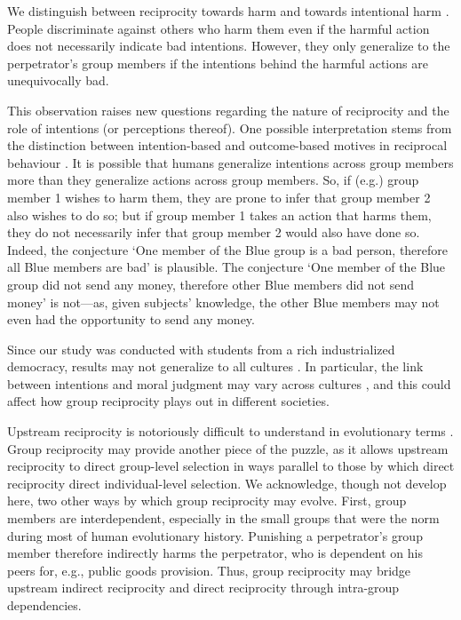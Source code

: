 \documentclass[12pt,a4paper]{article}\usepackage[]{graphicx}\usepackage[]{color}
\begin{document}
We distinguish between reciprocity towards harm and towards intentional harm
\citep{stanca2009testing}. People discriminate against others who harm them even
if the harmful action does not necessarily indicate bad intentions. However,
they only generalize to the perpetrator's  group members if the intentions
behind the harmful actions are unequivocally bad.

This observation raises new questions regarding the nature of reciprocity
and the role of intentions (or perceptions thereof). One possible
interpretation stems from the distinction between intention-based
and outcome-based motives in reciprocal behaviour \citep{falk2006theory}. It is
possible that humans generalize intentions across group members more than they generalize
actions across group members. So, if (e.g.)  group member 1 wishes to harm them,  they are prone to infer
that group member 2 also wishes to do so; but if group member 1 takes an action
that harms them, they do not necessarily infer that group member 2 would also
have done so. Indeed, the conjecture `One member of the Blue
group is a bad person, therefore all Blue members are bad' is plausible.
The conjecture `One member of the Blue group did not send any money,
therefore other Blue members did not send money' is not---as, given subjects' knowledge, the other Blue members may not even had the opportunity to send any money.

Since our study was conducted with students from a rich industrialized democracy, results may not generalize to all cultures \citep{henrich2010most}. In particular, the link between intentions and moral judgment may vary across cultures \citep{barrett2016small}, and this could affect how group reciprocity plays out in different societies.

Upstream reciprocity is notoriously difficult to understand in evolutionary
terms \citep{boyd1989evolution,nowak2007upstream}. Group reciprocity
may provide another piece of the puzzle, as it allows upstream reciprocity to direct group-level selection in ways parallel to those by which direct reciprocity direct individual-level selection.
We acknowledge, though not develop here, two other ways by which group reciprocity may evolve.
First, group members are interdependent, especially in the small groups that were the norm during most of human evolutionary history. Punishing a perpetrator's group member therefore indirectly harms the perpetrator, who is dependent on his peers for, e.g., public goods provision. Thus, group reciprocity may bridge upstream indirect reciprocity and direct reciprocity through intra-group dependencies.
\end{document}
